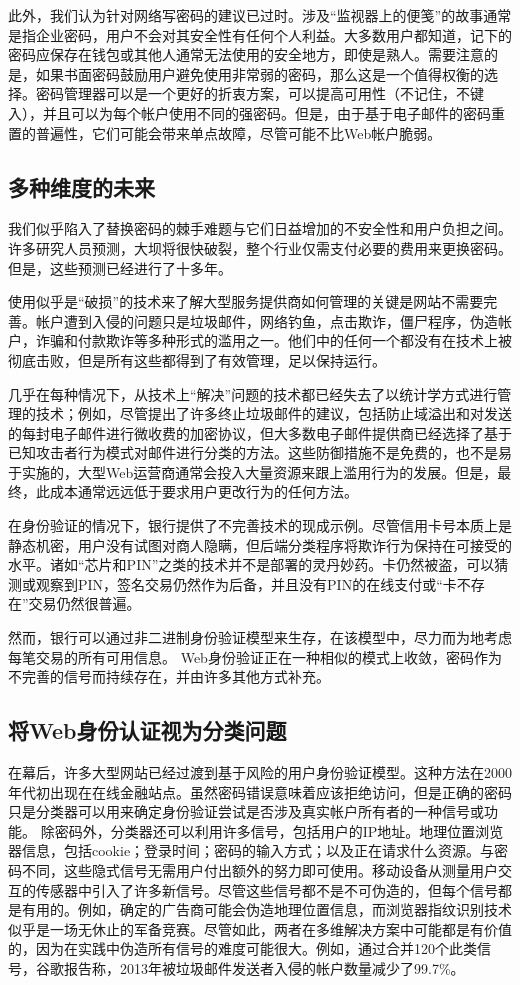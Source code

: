 此外，我们认为针对网络写密码的建议已过时。涉及“监视器上的便笺”的故事通常是指企业密码，用户不会对其安全性有任何个人利益。大多数用户都知道，记下的密码应保存在钱包或其他人通常无法使用的安全地方，即使是熟人。需要注意的是，如果书面密码鼓励用户避免使用非常弱的密码，那么这是一个值得权衡的选择。密码管理器可以是一个更好的折衷方案，可以提高可用性（不记住，不键入），并且可以为每个帐户使用不同的强密码。但是，由于基于电子邮件的密码重置的普遍性，它们可能会带来单点故障，尽管可能不比Web帐户脆弱。

\subsection{多种维度的未来}

我们似乎陷入了替换密码的棘手难题与它们日益增加的不安全性和用户负担之间。许多研究人员预测，大坝将很快破裂，整个行业仅需支付必要的费用来更换密码。但是，这些预测已经进行了十多年。

使用似乎是“破损”的技术来了解大型服务提供商如何管理的关键是网站不需要完善。帐户遭到入侵的问题只是垃圾邮件，网络钓鱼，点击欺诈，僵尸程序，伪造帐户，诈骗和付款欺诈等多种形式的滥用之一。他们中的任何一个都没有在技术上被彻底击败，但是所有这些都得到了有效管理，足以保持运行。

几乎在每种情况下，从技术上“解决”问题的技术都已经失去了以统计学方式进行管理的技术；例如，尽管提出了许多终止垃圾邮件的建议，包括防止域溢出和对发送的每封电子邮件进行微收费的加密协议，但大多数电子邮件提供商已经选择了基于已知攻击者行为模式对邮件进行分类的方法。这些防御措施不是免费的，也不是易于实施的，大型Web运营商通常会投入大量资源来跟上滥用行为的发展。但是，最终，此成本通常远远低于要求用户更改行为的任何方法。

在身份验证的情况下，银行提供了不完善技术的现成示例。尽管信用卡号本质上是静态机密，用户没有试图对商人隐瞒，但后端分类程序将欺诈行为保持在可接受的水平。诸如“芯片和PIN”之类的技术并不是部署的灵丹妙药。卡仍然被盗，可以猜测或观察到PIN，签名交易仍然作为后备，并且没有PIN的在线支付或“卡不存在”交易仍然很普遍。

然而，银行可以通过非二进制身份验证模型来生存，在该模型中，尽力而为地考虑每笔交易的所有可用信息。 Web身份验证正在一种相似的模式上收敛，密码作为不完善的信号而持续存在，并由许多其他方式补充。

\subsection{将Web身份认证视为分类问题}

在幕后，许多大型网站已经过渡到基于风险的用户身份验证模型。这种方法在2000年代初出现在在线金融站点。虽然密码错误意味着应该拒绝访问，但是正确的密码只是分类器可以用来确定身份验证尝试是否涉及真实帐户所有者的一种信号或功能。
除密码外，分类器还可以利用许多信号，包括用户的IP地址。地理位置浏览器信息，包括cookie；登录时间；密码的输入方式；以及正在请求什么资源。与密码不同，这些隐式信号无需用户付出额外的努力即可使用。移动设备从测量用户交互的传感器中引入了许多新信号。尽管这些信号都不是不可伪造的，但每个信号都是有用的。例如，确定的广告商可能会伪造地理位置信息，而浏览器指纹识别技术似乎是一场无休止的军备竞赛。尽管如此，两者在多维解决方案中可能都是有价值的，因为在实践中伪造所有信号的难度可能很大。例如，通过合并120个此类信号，谷歌报告称，2013年被垃圾邮件发送者入侵的帐户数量减少了99.7\%。

